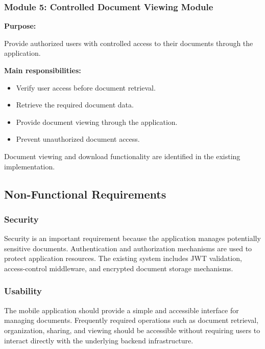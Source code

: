 \documentclass[12pt]{article}
\begin{document}
\subsubsection{Module 5: Controlled Document Viewing Module}

\textbf{Purpose:}

Provide authorized users with controlled access to their documents through the application.

\textbf{Main responsibilities:}

\begin{itemize}
    \item Verify user access before document retrieval.
    \item Retrieve the required document data.
    \item Provide document viewing through the application.
    \item Prevent unauthorized document access.
\end{itemize}

Document viewing and download functionality are identified in the existing implementation.


\subsection{Non-Functional Requirements}


\subsubsection{Security}

Security is an important requirement because the application manages potentially sensitive documents. Authentication and authorization mechanisms are used to protect application resources. The existing system includes JWT validation, access-control middleware, and encrypted document storage mechanisms.


\subsubsection{Usability}

The mobile application should provide a simple and accessible interface for managing documents. Frequently required operations such as document retrieval, organization, sharing, and viewing should be accessible without requiring users to interact directly with the underlying backend infrastructure.
\end{document}
